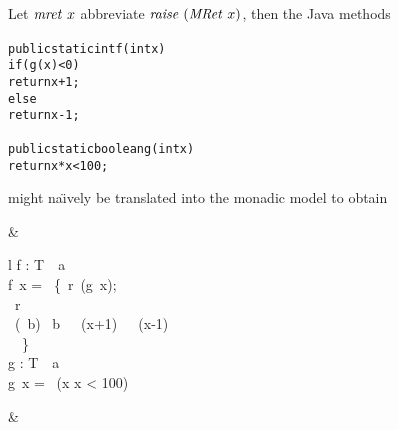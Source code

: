 \begin{expl} \label{ex:java-to-monad} Let $\mathit{mret}\ x$ abbreviate $\mathit{raise}\
  (\mathit{MRet}\ x)$, then the Java methods
\begin{alltt}
public static int f(int x) {
  if (g(x) < 0)
    return x + 1;
  else
    return x - 1;
}

public static boolean g(int x) {
  return x*x < 100;
}
\end{alltt}
might na\"\i vely be translated into the monadic model  to obtain
{
  \newcommand{\filla}{\hspace*{1.8cm}}
  \newcommand{\fillaa}{\hspace*{2.5cm}}
  \begin{flalign*}
    & 
    \begin{array}{l}
         f :  \to T\ \ a \\
         f\ x = \DO\ \{\ r \catchEx\ (g~x);\\
         \filla \Case\ r\ \Of\\
         \fillaa \inl~(~b) \to \If\ b\ \Then\ ~(x+1)\ \Else\
         ~(x-1)\\
         \fillaa \Arg \quad \to \raiseEx\ \op{Error}\ \}\\[2ex]
         g : \Type{Int} \to T\ \Omega\ a\\
         g\ x = \op{mret}\ (x \cdot x < 100)
    \end{array} & \mbox{}
  \end{flalign*}
}


\end{expl}
